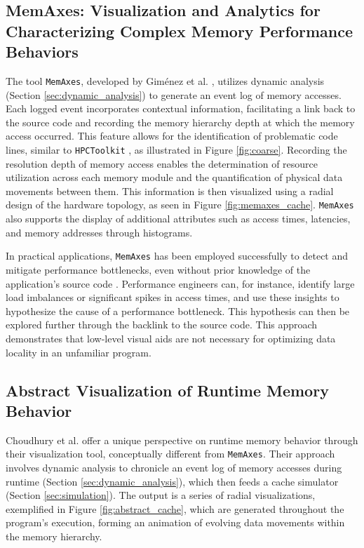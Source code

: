 \subsection{MemAxes: Visualization and Analytics for Characterizing Complex Memory Performance Behaviors}\label{sec:memaxes}
The tool \texttt{MemAxes}, developed by Giménez et al. \cite{gimenez2017memaxes}, utilizes dynamic analysis (Section \ref{sec:dynamic_analysis}) to generate an event log of memory accesses. Each logged event incorporates contextual information, facilitating a link back to the source code and recording the memory hierarchy depth at which the memory access occurred. This feature allows for the identification of problematic code lines, similar to \texttt{HPCToolkit} \cite{adhianto2010hpctoolkit}, as illustrated in Figure \ref{fig:coarse}. Recording the resolution depth of memory access enables the determination of resource utilization across each memory module and the quantification of physical data movements between them. This information is then visualized using a radial design of the hardware topology, as seen in Figure \ref{fig:memaxes_cache}. \texttt{MemAxes} also supports the display of additional attributes such as access times, latencies, and memory addresses through histograms.

In practical applications, \texttt{MemAxes} has been employed successfully to detect and mitigate performance bottlenecks, even without prior knowledge of the application's source code \cite{gimenez2017memaxes}. Performance engineers can, for instance, identify large load imbalances or significant spikes in access times, and use these insights to hypothesize the cause of a performance bottleneck. This hypothesis can then be explored further through the backlink to the source code. This approach demonstrates that low-level visual aids are not necessary for optimizing data locality in an unfamiliar program.

\subsection{Abstract Visualization of Runtime Memory Behavior}\label{sec:abstract}

Choudhury et al. \cite{choudhury2011abstract} offer a unique perspective on runtime memory behavior through their visualization tool, conceptually different from \texttt{MemAxes}. Their approach involves dynamic analysis to chronicle an event log of memory accesses during runtime (Section \ref{sec:dynamic_analysis}), which then feeds a cache simulator (Section \ref{sec:simulation}). The output is a series of radial visualizations, exemplified in Figure \ref{fig:abstract_cache}, which are generated throughout the program's execution, forming an animation of evolving data movements within the memory hierarchy.

